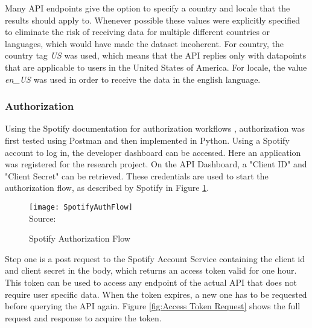 Many API endpoints give the option to specify a country and locale that the results should apply to.
Whenever possible these values were explicitly specified to eliminate the risk of receiving data for multiple different
countries or languages, which would have made the dataset incoherent.
For country, the country tag \emph{US} was used, which means that the API replies only with datapoints that are
applicable to users in the United States of America.
For locale, the value \emph{en\_US} was used in order to receive the data in the english language.

\subsubsection{Authorization}

Using the Spotify documentation for authorization workflows \cite{SpotifyAuth}, authorization was first tested
using Postman and then implemented in Python.
Using a Spotify account to log in, the developer dashboard can be accessed. Here an application was registered
for the research project.
On the API Dashboard, a "Client ID" and "Client Secret" can be retrieved. These credentials are used to start
the authorization flow, as described by Spotify in Figure \ref{fig:Spotify Authorization Flow}.

\begin{figure}[H]
    \caption{Spotify Authorization Flow}
	\label{fig:Spotify Authorization Flow}
    \texttt{[image: SpotifyAuthFlow]}
    \\
    Source: \cite{SpotifyAuth}
\end{figure}

Step one is a post request to the Spotify Account Service containing the client id and client secret in the body,
which returns an access token valid for one hour.
This token can be used to access any endpoint of the actual \ac{API} that does not require user specific data.
When the token expires, a new one has to be requested before querying the \ac{API} again.
Figure \ref{fig:Access Token Request} shows the full request and response to acquire the token.


